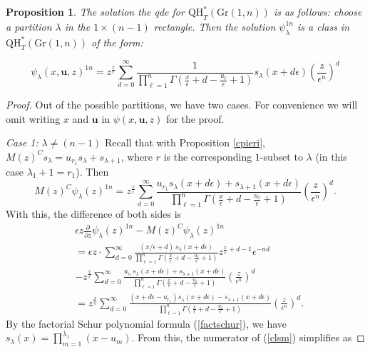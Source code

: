 \documentclass[12pt]{article}
\newtheorem{proposition}[theorem]{Proposition}
\theoremstyle{plain}
\theoremstyle{definition}
\newcommand{\ub}{\boldsymbol{u}}
\begin{document}
\begin{proposition} \label{qdesolnceq1n}
    The solution the qde for $\mathrm{QH}^*_T(\mathrm{Gr}(1,n))$ is as follows: choose a partition $\lambda$ in the $1\times (n-1)$ rectangle. Then the solution $\psi_\lambda^{1n}$ is a class in $\mathrm{QH}^*_T(\mathrm{Gr}(1,n))$ of the form:

    \begin{equation}
        \psi_\lambda ({x}, \ub, z)^{1n} = z^{\frac{x}{\epsilon}} \sum_{d=0} ^\infty \frac{1}{\prod \limits_{\ell=1} ^n \Gamma \left(\frac{x}{\epsilon}+d-\frac{u_\ell}{\epsilon}+1\right) }s_\lambda (x+d \epsilon) \left(\frac{z}{\epsilon^n}\right)^d
    \end{equation}
\end{proposition}
\begin{proof}
Out of the possible partitions, we have two cases. For convenience we will omit writing $x$ and $\ub$ in $\psi(x,\ub,z)$ for the proof.
\vspace{.5cm}

\emph{Case 1:}  $\lambda \neq (n-1)$
Recall that with Proposition \ref{cpieri}, $M(z)^C s_\lambda = u_{r_1} s_\lambda + s_{\lambda+1}$, where $r$ is the corresponding $1$-subset to $\lambda$ (in this case $\lambda_1+1=r_1$). Then 
$$M(z)^C\psi_\lambda (z)^{1n} =  z^{\frac{x}{\epsilon}} \sum_{d=0} ^\infty \frac{ u_{r_1} s_\lambda (x+d \epsilon) +s_{\lambda+1} (x+d \epsilon) }{\prod_{\ell=1} ^n \Gamma \left(\frac{x}{\epsilon}+d-\frac{u_\ell}{\epsilon}+1\right)}\left(\frac{z}{\epsilon^n}\right)^d.$$
With this, the difference of both sides is
\begin{align}
&\epsilon z \frac{\partial }{\partial z} \psi_\lambda(z)^{1n} - M(z)^{C} \psi_\lambda(z)^{1n} \nonumber\\
&= \epsilon z \cdot   \sum_{d=0} ^\infty \frac{(x/\epsilon +d)\, s_\lambda (x+d \epsilon) }{\prod_{\ell=1} ^n \Gamma \left(\frac{x}{\epsilon}+d-\frac{u_\ell}{\epsilon}+1\right)} z^{\frac{x}{\epsilon}+d-1}{\epsilon^{-nd}}     \\
&-z^{\frac{x}{\epsilon}}     \sum_{d=0} ^\infty \frac{ u_{r_1} s_\lambda (x+d \epsilon) +s_{\lambda+1} (x+d \epsilon) }{\prod_{\ell=1} ^n \Gamma \left(\frac{x}{\epsilon}+d-\frac{u_\ell}{\epsilon}+1\right)}\left(\frac{z}{\epsilon^n}\right)^d \nonumber \\
&=z^{\frac{x}{\epsilon}}     \sum_{d=0} ^\infty \frac{ (x+d\epsilon -u_{r_1}) s_\lambda (x+d \epsilon) -s_{\lambda+1} (x+d \epsilon) }{\prod_{\ell=1} ^n \Gamma \left(\frac{x}{\epsilon}+d-\frac{u_\ell}{\epsilon}+1\right)}\left(\frac{z}{\epsilon^n}\right)^d.\label{clsm}
\end{align}
By the factorial Schur polynomial formula (\ref{factschur}), we have $s_\lambda(x) = \prod_{m=1}^{\lambda_1}(x-u_m)$. From this, the numerator of (\ref{clsm}) simplifies as


\end{proof}
\end{document}
